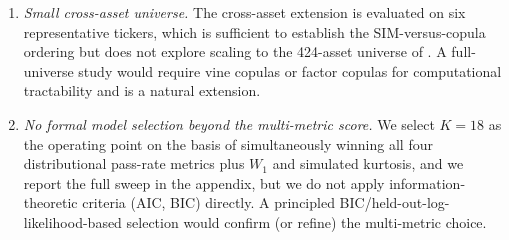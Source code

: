 \begin{enumerate}
    \item \textit{Small cross-asset universe.}
    The cross-asset extension is evaluated on six representative tickers, which is sufficient to establish the SIM-versus-copula ordering but does not explore scaling to the 424-asset universe of \citet{alswaidan2026hybrid}.
    A full-universe study would require vine copulas or factor copulas for computational tractability and is a natural extension.

    \item \textit{No formal model selection beyond the multi-metric score.}
    We select $K = 18$ as the operating point on the basis of simultaneously winning all four distributional pass-rate metrics plus $W_1$ and simulated kurtosis, and we report the full sweep in the appendix, but we do not apply information-theoretic criteria (AIC, BIC) directly.
    A principled BIC/held-out-log-likelihood-based selection would confirm (or refine) the multi-metric choice.
\end{enumerate}
